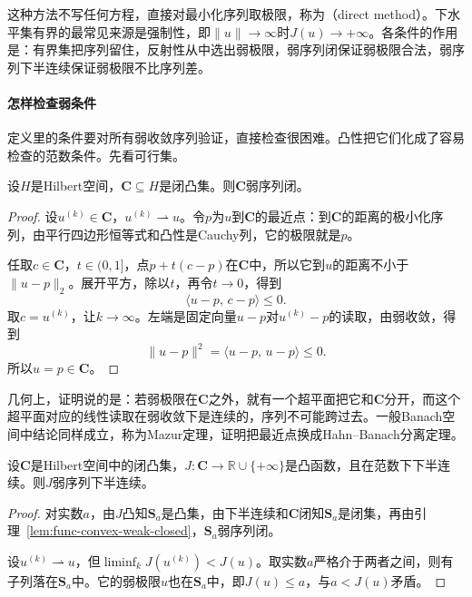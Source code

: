 这种方法不写任何方程，直接对最小化序列取极限，称为（direct method）。下水平集有界的最常见来源是强制性，即$\lVert u\rVert\to\infty$时$J(u)\to+\infty$。各条件的作用是：有界集把序列留住，反射性从中选出弱极限，弱序列闭保证弱极限合法，弱序列下半连续保证弱极限不比序列差。

\paragraph{怎样检查弱条件}
定义里的条件要对所有弱收敛序列验证，直接检查很困难。凸性把它们化成了容易检查的范数条件。先看可行集。

\begin{lemma}[闭凸集弱序列闭]
\label{lem:func-convex-weak-closed}
设$H$是Hilbert空间，$\bm{C}\subseteq H$是闭凸集。则$\bm{C}$弱序列闭。
\end{lemma}

\begin{proof}
设$u^{(k)}\in\bm{C}$，$u^{(k)}\rightharpoonup u$。令$p$为$u$到$\bm{C}$的最近点：到$\bm{C}$的距离的极小化序列，由平行四边形恒等式和凸性是Cauchy列，它的极限就是$p$。

任取$c\in\bm{C}$，$t\in(0,1]$，点$p+t(c-p)$在$\bm{C}$中，所以它到$u$的距离不小于$\lVert u-p\rVert_2$。展开平方，除以$t$，再令$t\to0$，得到
\[
 \langle u-p,\,c-p\rangle\leq0.
\]
取$c=u^{(k)}$，让$k\to\infty$。左端是固定向量$u-p$对$u^{(k)}-p$的读取，由弱收敛，得到
\[
 \lVert u-p\rVert^2=\langle u-p,\,u-p\rangle\leq0.
\]
所以$u=p\in\bm{C}$。
\end{proof}

几何上，证明说的是：若弱极限在$\bm{C}$之外，就有一个超平面把它和$\bm{C}$分开，而这个超平面对应的线性读取在弱收敛下是连续的，序列不可能跨过去。一般Banach空间中结论同样成立，称为Mazur定理，证明把最近点换成Hahn--Banach分离定理。

\begin{lemma}[凸与下半连续蕴含弱序列下半连续]
\label{lem:func-convex-weak-lsc}
设$\bm{C}$是Hilbert空间中的闭凸集，$J:\bm{C}\to\mathbb{R}\cup\{+\infty\}$是凸函数，且在范数下下半连续。则$J$弱序列下半连续。
\end{lemma}

\begin{proof}
对实数$a$，由$J$凸知$\bm{S}_a$是凸集，由下半连续和$\bm{C}$闭知$\bm{S}_a$是闭集，再由引理~\ref{lem:func-convex-weak-closed}，$\bm{S}_a$弱序列闭。

设$u^{(k)}\rightharpoonup u$，但$\liminf_kJ(u^{(k)})<J(u)$。取实数$a$严格介于两者之间，则有子列落在$\bm{S}_a$中。它的弱极限$u$也在$\bm{S}_a$中，即$J(u)\leq a$，与$a<J(u)$矛盾。
\end{proof}

